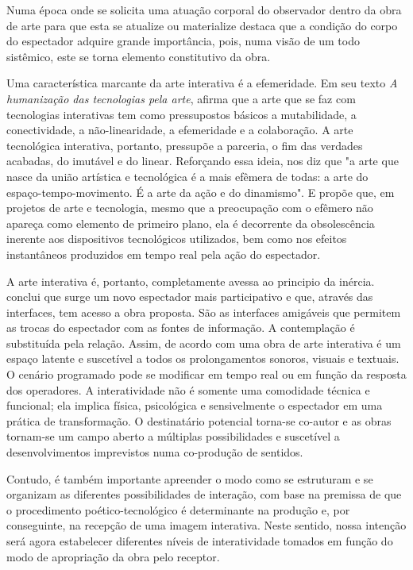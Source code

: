 Numa época onde se solicita uma atuação corporal do observador dentro da obra de arte para que esta se atualize ou materialize  destaca que a condição do corpo do espectador adquire grande importância, pois, numa visão de um todo sistêmico, este se torna elemento constitutivo da obra. 


Uma característica marcante da arte interativa é a efemeridade. Em seu texto \textit{A humanização das tecnologias pela arte},  afirma que a arte que se faz com tecnologias interativas tem como pressupostos básicos a mutabilidade, a conectividade, a não-linearidade, a efemeridade e a colaboração. A arte tecnológica interativa, portanto, pressupõe a parceria, o fim das verdades acabadas, do imutável e do linear. Reforçando essa ideia,  nos diz que "a arte que nasce da união artística e tecnológica é a mais efêmera de todas: a arte do espaço-tempo-movimento. É a arte da ação e do dinamismo". E  propõe que, em projetos de arte e tecnologia, mesmo que a preocupação com o efêmero não apareça como elemento de primeiro plano, ela é decorrente da obsolescência inerente aos dispositivos tecnológicos utilizados, bem como nos efeitos instantâneos produzidos em tempo real pela ação do espectador.

A arte interativa é, portanto, completamente avessa ao principio da inércia.  conclui que surge um novo espectador mais participativo e que, através das interfaces, tem acesso a obra proposta. São as interfaces amigáveis que permitem as trocas do espectador com as fontes de informação. A contemplação é substituída pela relação. Assim, de acordo com  uma obra de arte interativa é um espaço latente e suscetível a todos os prolongamentos sonoros, visuais e textuais. O cenário programado pode se modificar em tempo real ou em função da resposta dos operadores. A interatividade não é somente uma comodidade técnica e funcional; ela implica física, psicológica e sensivelmente o espectador em uma prática de transformação. O destinatário potencial torna-se co-autor e as obras tornam-se um campo aberto a múltiplas possibilidades e suscetível a desenvolvimentos imprevistos numa co-produção de sentidos.	


Contudo, é também importante apreender o modo como se estruturam e se organizam
as diferentes possibilidades de interação, com base na premissa de que o procedimento
poético-tecnológico é determinante na produção e, por conseguinte, na recepção de uma
imagem interativa. Neste sentido, nossa intenção será agora estabelecer diferentes níveis de interatividade tomados em função do modo de apropriação da obra pelo receptor. \cite{tavares}



